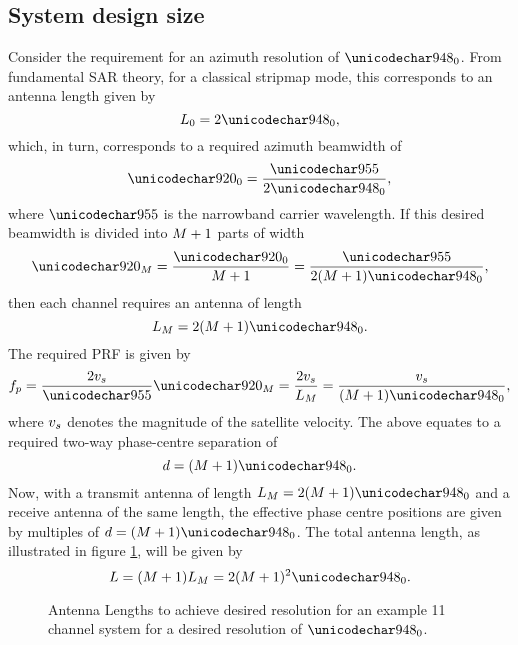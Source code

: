 \subsection{System design size}
Consider the requirement for an azimuth resolution of $\resxDesired$. From fundamental SAR theory, for a classical stripmap mode, this corresponds to an antenna length given by \cite{Cumming2005}
\begin{equation}
 \antennaLengthDesired = 2\resxDesired,
\end{equation}
which, in turn, corresponds to a required azimuth beamwidth of
\begin{equation}
 \threeDBDesired = \frac{\wavelength}{2\resxDesired},
\end{equation}
where $\wavelength$ is the narrowband carrier wavelength.
If this desired beamwidth is divided into $M + 1$ parts of width
\begin{equation}
 \threeDBEffective = \frac{\threeDBDesired}{\channelM + 1}=\frac{\wavelength}{2(\channelM + 1)\resxDesired},
\end{equation}
then each channel requires an antenna of length
\begin{equation}
 \antennaLengthEffective = 2(\channelM + 1)\resxDesired.
\end{equation}
The required PRF is given by
\begin{equation}
 \prfEffective = \frac{2\satv}{\wavelength}\threeDBEffective = \frac{2\satv}{\antennaLengthEffective} = \frac{\satv}{(\channelM + 1)\resxDesired},
 \label{eq:requiredPRF}
\end{equation}
where $v_s$ denotes the magnitude of the satellite  velocity. The above equates to a required two-way phase-centre separation of
\begin{equation}
 \phaseSep = (\channelM + 1)\resxDesired.
\end{equation}
Now, with a transmit antenna of length $\antennaLengthEffective = 2(\channelM + 1)\resxDesired$ and a receive antenna of the same length, the effective phase centre positions are given by  multiples of $\phaseSep = (\channelM + 1)\resxDesired$. The total antenna length, as illustrated in figure \ref{fg:antennaLenghts}, will be given by
\begin{equation}
 \antennaLength = (\channelM + 1)\antennaLengthEffective = 2(\channelM + 1)^2\resxDesired.
\end{equation}
\begin{figure}[h!]
\begin{center}
 \resizebox{0.5\columnwidth}{!}{}
 \caption{Antenna Lengths to achieve desired resolution for an example 11 channel system for a desired resolution of $\resxDesired$.}
 \label{fg:antennaLenghts}
 \end{center}
\end{figure}

